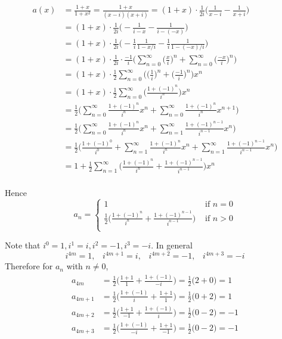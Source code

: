 \begin{align*}
a(x) 
&= \frac{1 + x}{1 + x^2} = \frac{1 + x}{(x - i)(x + i)} =(1+x) \cdot
\frac{1}{2i} 
\biggl(
\frac{1}{x - i}
-
\frac{1}{x + i}
\biggr) \\
&= (1+x) \cdot \frac{1}{2i}
\biggl(
-\frac{1}{i - x}
-
\frac{1}{i - (-x)}
\biggr) \\
&= (1+x) \cdot \frac{1}{2i}
\biggl(
-\frac{1}{i}\frac{1}{1 - x/i}
-
\frac{1}{i}\frac{1}{1 - (-x)/i}
\biggr) \\
&= (1+x) \cdot \frac{1}{2i} \cdot \frac{-1}{i}
\biggl(
\sum_{n=0}^\infty \biggl( \frac{x}{i} \biggr)^n
+
\sum_{n=0}^\infty \biggl( \frac{-x}{i} \biggr)^n
\biggr) \\
&= (1+x) \cdot \frac{1}{2}
\sum_{n=0}^\infty 
\biggl(
\biggl(
\frac{1}{i} 
\biggr)^n
+
\biggl(
\frac{-1}{i} 
\biggr)^n
\biggr) 
x^n \\
&= (1+x) \cdot \frac{1}{2}
\sum_{n=0}^\infty 
\biggl(
\frac{1 + (-1)^n}{i^n} 
\biggr) 
x^n \\
&= 
\frac{1}{2}
\biggr(
\sum_{n=0}^\infty 
\frac{1 + (-1)^n}{i^n} 
x^n 
+
\sum_{n=0}^\infty 
\frac{1 + (-1)^n}{i^n} 
x^{n+1} 
\biggr)
\\
&= \frac{1}{2}
\biggl(
\sum_{n=0}^\infty 
\frac{1 + (-1)^n}{i^n} 
x^n 
+
\sum_{n=1}^\infty 
\frac{1 + (-1)^{n-1}}{i^{n-1}} 
x^{n} 
\biggr) \\
&= \frac{1}{2}
\biggl(
\frac{1 + (-1)^0}{i^0}
+
\sum_{n=1}^\infty 
\frac{1 + (-1)^n}{i^n} 
x^n 
+
\sum_{n=1}^\infty 
\frac{1 + (-1)^{n-1}}{i^{n-1}} 
x^{n} 
\biggr) \\
&= 1 + \frac{1}{2}
\sum_{n=1}^\infty
\biggl(
\frac{1 + (-1)^n}{i^n} 
+
\frac{1 + (-1)^{n-1}}{i^{n-1}} 
\biggl)
x^{n} \\
%
\end{align*}

\vfill\eject

Hence
\[
a_n = 
\begin{cases}
1 & \text{ if } n = 0 \\
\frac{1}{2}
\biggl(
\frac{1 + (-1)^n}{i^n} 
+
\frac{1 + (-1)^{n-1}}{i^{n-1}} \biggr) & \text{ if } n > 0 \\
\end{cases}
\]

Note that $i^0 = 1, i^1 = i, i^2 = -1, i^3 = -i$.
In general 
\[
i^{4m} = 1, \,\,\,\,\,
i^{4m+1} = i,  \,\,\,\,\,
i^{4m+2} = -1,  \,\,\,\,\,
i^{4m+3} = -i
\]
Therefore for $a_n$ with $n \neq 0$,
\begin{align*}
a_{4m} 
&= 
\frac{1}{2} 
\biggl( \frac{1 + 1}{1} + \frac{1 + (-1)}{-i} 
\biggr)
= \frac{1}{2} \bigl( 2 + 0 \bigr) = 1 \\
a_{4m+1} 
&= 
\frac{1}{2} \biggl( \frac{1 + (-1)}{i} + \frac{1 + 1}{1} \biggr)
= \frac{1}{2} \bigl( 0 + 2 \bigr) = 1 
\\
a_{4m+2} 
&= 
\frac{1}{2} 
\biggl( 
\frac{1 + 1}{-1} + \frac{1 + (-1)}{i} \biggr) 
= \frac{1}{2} \bigr( 0 - 2 \bigr) = -1 
\\ 
a_{4m+3} 
&= 
\frac{1}{2} \biggl( \frac{1 + (-1)}{-i} + \frac{1 + 1}{-1} \biggr) 
= \frac{1}{2} \bigl( 0 - 2 \bigr) = -1 \\ 
\end{align*}

